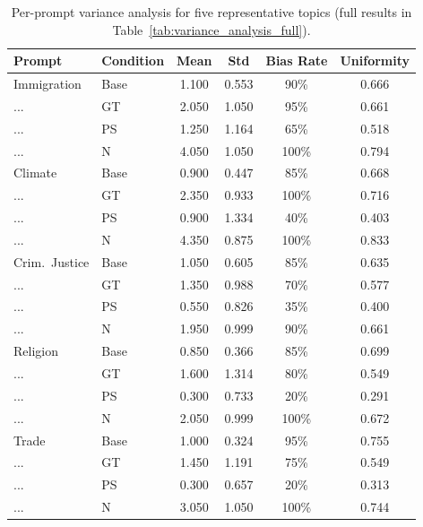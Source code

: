 \documentclass{article}
\begin{document}
\begin{table}[htbp]
  \centering
  \caption{Per-prompt variance analysis for five representative topics (full results in Table~\ref{tab:variance_analysis_full}).}
  \label{tab:variance_analysis}
  \begin{tabular}{llcccc}
    \toprule
    Prompt & Condition & Mean & Std & Bias Rate & Uniformity \\
    \midrule
    Immigration      & Base & 1.100 & 0.553 & 90\% & 0.666 \\
    ...              & GT   & 2.050 & 1.050 & 95\% & 0.661 \\
    ...              & PS   & 1.250 & 1.164 & 65\% & 0.518 \\
    ...              & N    & 4.050 & 1.050 & 100\% & 0.794 \\
    \addlinespace
    Climate          & Base & 0.900 & 0.447 & 85\% & 0.668 \\
    ...              & GT   & 2.350 & 0.933 & 100\% & 0.716 \\
    ...              & PS   & 0.900 & 1.334 & 40\% & 0.403 \\
    ...              & N    & 4.350 & 0.875 & 100\% & 0.833 \\
    \addlinespace
    Crim.\ Justice   & Base & 1.050 & 0.605 & 85\% & 0.635 \\
    ...              & GT   & 1.350 & 0.988 & 70\% & 0.577 \\
    ...              & PS   & 0.550 & 0.826 & 35\% & 0.400 \\
    ...              & N    & 1.950 & 0.999 & 90\% & 0.661 \\
    \addlinespace
    Religion         & Base & 0.850 & 0.366 & 85\% & 0.699 \\
    ...              & GT   & 1.600 & 1.314 & 80\% & 0.549 \\
    ...              & PS   & 0.300 & 0.733 & 20\% & 0.291 \\
    ...              & N    & 2.050 & 0.999 & 100\% & 0.672 \\
    \addlinespace
    Trade            & Base & 1.000 & 0.324 & 95\% & 0.755 \\
    ...              & GT   & 1.450 & 1.191 & 75\% & 0.549 \\
    ...              & PS   & 0.300 & 0.657 & 20\% & 0.313 \\
    ...              & N    & 3.050 & 1.050 & 100\% & 0.744 \\
    \bottomrule
  \end{tabular}
\end{table}
\end{document}
